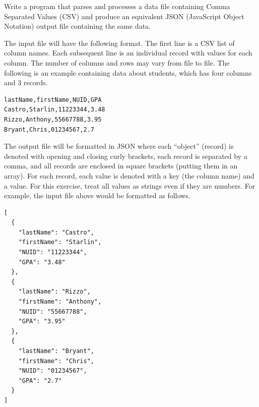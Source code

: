 \begin{exer}
Write a program that parses and processes a data file containing 
Comma Separated Values (CSV) and produce an equivalent
JSON (JavaScript Object Notation) output file containing the same 
data.  

The input file will have the following format.  The first line is a CSV 
list of column names.  Each subsequent line is an individual record 
with values for each column. The number of columns and rows may 
vary from file to file.  The following is an example containing data 
about students, which has four columns and 3 records.

\begin{verbatim}
lastName,firstName,NUID,GPA
Castro,Starlin,11223344,3.48
Rizzo,Anthony,55667788,3.95
Bryant,Chris,01234567,2.7
\end{verbatim}

The output file will be formatted in JSON where each ``object'' 
(record) is denoted with opening and closing curly brackets, each 
record is separated by a comma, and all records are enclosed in 
square brackets (putting them in an array).  For each record, each 
value is denoted with a key (the column name) and a value.  For
this exercise, treat all values as strings even if they are numbers.  
For example, the input file above would be formatted as follows.

\begin{verbatim}
[
  {
    "lastName": "Castro",
    "firstName": "Starlin",
    "NUID": "11223344",
    "GPA": "3.48"
  },
  {
    "lastName": "Rizzo",
    "firstName": "Anthony",
    "NUID": "55667788",
    "GPA": "3.95"
  },
  {
    "lastName": "Bryant",
    "firstName": "Chris",
    "NUID": "01234567",
    "GPA": "2.7"
  }
]
\end{verbatim}

\end{exer}

